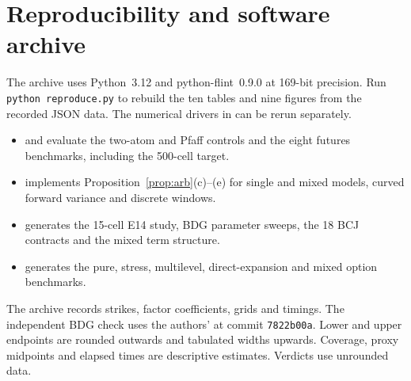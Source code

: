 \section{Reproducibility and software archive}\label{app:repro}

The \href{\ReleaseURL}{\RoughCert{} \ReleaseTag} archive uses Python~3.12 and python-flint~0.9.0 at 169-bit precision.
Run \texttt{python\ reproduce.py} to rebuild the ten tables and nine figures from the recorded JSON data. The numerical drivers in  can be rerun separately.

\begin{itemize}
\item {} and  evaluate the two-atom and Pfaff controls and the eight futures benchmarks, including the 500-cell target.
\item {} implements Proposition~\ref{prop:arb}(c)--(e) for single and mixed models, curved forward variance and discrete windows.
\item {} generates the 15-cell E14 study, BDG parameter sweeps, the 18 BCJ contracts and the mixed term structure.
\item {} generates the pure, stress, multilevel, direct-expansion and mixed option benchmarks.
\end{itemize}

The archive records strikes, factor coefficients, grids and timings. The independent BDG check uses the authors'  at commit \texttt{7822b00a}. Lower and upper endpoints are rounded outwards and tabulated widths upwards. Coverage, proxy midpoints and elapsed times are descriptive estimates. Verdicts use unrounded data.
